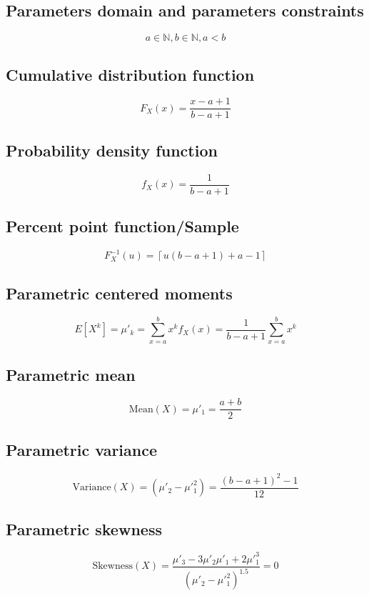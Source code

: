 \documentclass{article}
\begin{document}
\subsection{Parameters domain and parameters constraints}
\begin{equation*} a\in\mathbb{N}, b\in\mathbb{N}, a < b \end{equation*}
\subsection{Cumulative distribution function}
\begin{equation*} F_{X}\left(x\right)=\frac{x -a+1}{b-a+1} \end{equation*}
\subsection{Probability density function}
\begin{equation*} f_{X}\left(x\right)=\frac{1}{b-a+1} \end{equation*}
\subsection{Percent point function/Sample}
\begin{equation*} F^{-1}_{X}\left(u\right)=\left\lceil u(b-a+1)+a-1 \right\rceil \end{equation*}
\subsection{Parametric centered moments}
\begin{equation*} E[X^k]=\mu'_{k}=\sum_{x=a}^{b}x^{k}f_{X}\left(x\right)=\frac{1}{b-a+1}\sum_{x=a}^{b}x^{k} \end{equation*}
\subsection{Parametric mean}
\begin{equation*} \mathrm{Mean}(X)=\mu'_{1}=\frac{a+b}{2} \end{equation*}
\subsection{Parametric variance}
\begin{equation*} \mathrm{Variance}(X)=(\mu'_{2}-\mu'^{2}_{1})=\frac{(b-a+1)^2-1}{12} \end{equation*}
\subsection{Parametric skewness}
\begin{equation*} \mathrm{Skewness}(X)=\frac{\mu'_{3}-3\mu'_{2}\mu'_{1}+2\mu'^{3}_{1}}{(\mu'_{2}-\mu'^{2}_{1})^{1.5}}=0 \end{equation*}
\end{document}
